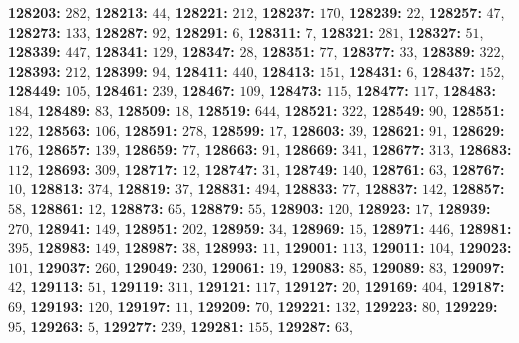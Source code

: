 \textsf{\bfseries 128203:} $282$, \textsf{\bfseries 128213:} $44$, \textsf{\bfseries 128221:} $212$, \textsf{\bfseries 128237:} $170$, \textsf{\bfseries 128239:} $22$, \textsf{\bfseries 128257:} $47$, \textsf{\bfseries 128273:} $133$, \textsf{\bfseries 128287:} $92$, \textsf{\bfseries 128291:} $6$, \textsf{\bfseries 128311:} $7$, \textsf{\bfseries 128321:} $281$, \textsf{\bfseries 128327:} $51$, \textsf{\bfseries 128339:} $447$, \textsf{\bfseries 128341:} $129$, \textsf{\bfseries 128347:} $28$, \textsf{\bfseries 128351:} $77$, \textsf{\bfseries 128377:} $33$, \textsf{\bfseries 128389:} $322$, \textsf{\bfseries 128393:} $212$, \textsf{\bfseries 128399:} $94$, \textsf{\bfseries 128411:} $440$, \textsf{\bfseries 128413:} $151$, \textsf{\bfseries 128431:} $6$, \textsf{\bfseries 128437:} $152$, \textsf{\bfseries 128449:} $105$, \textsf{\bfseries 128461:} $239$, \textsf{\bfseries 128467:} $109$, \textsf{\bfseries 128473:} $115$, \textsf{\bfseries 128477:} $117$, \textsf{\bfseries 128483:} $184$, \textsf{\bfseries 128489:} $83$, \textsf{\bfseries 128509:} $18$, \textsf{\bfseries 128519:} $644$, \textsf{\bfseries 128521:} $322$, \textsf{\bfseries 128549:} $90$, \textsf{\bfseries 128551:} $122$, \textsf{\bfseries 128563:} $106$, \textsf{\bfseries 128591:} $278$, \textsf{\bfseries 128599:} $17$, \textsf{\bfseries 128603:} $39$, \textsf{\bfseries 128621:} $91$, \textsf{\bfseries 128629:} $176$, \textsf{\bfseries 128657:} $139$, \textsf{\bfseries 128659:} $77$, \textsf{\bfseries 128663:} $91$, \textsf{\bfseries 128669:} $341$, \textsf{\bfseries 128677:} $313$, \textsf{\bfseries 128683:} $112$, \textsf{\bfseries 128693:} $309$, \textsf{\bfseries 128717:} $12$, \textsf{\bfseries 128747:} $31$, \textsf{\bfseries 128749:} $140$, \textsf{\bfseries 128761:} $63$, \textsf{\bfseries 128767:} $10$, \textsf{\bfseries 128813:} $374$, \textsf{\bfseries 128819:} $37$, \textsf{\bfseries 128831:} $494$, \textsf{\bfseries 128833:} $77$, \textsf{\bfseries 128837:} $142$, \textsf{\bfseries 128857:} $58$, \textsf{\bfseries 128861:} $12$, \textsf{\bfseries 128873:} $65$, \textsf{\bfseries 128879:} $55$, \textsf{\bfseries 128903:} $120$, \textsf{\bfseries 128923:} $17$, \textsf{\bfseries 128939:} $270$, \textsf{\bfseries 128941:} $149$, \textsf{\bfseries 128951:} $202$, \textsf{\bfseries 128959:} $34$, \textsf{\bfseries 128969:} $15$, \textsf{\bfseries 128971:} $446$, \textsf{\bfseries 128981:} $395$, \textsf{\bfseries 128983:} $149$, \textsf{\bfseries 128987:} $38$, \textsf{\bfseries 128993:} $11$, \textsf{\bfseries 129001:} $113$, \textsf{\bfseries 129011:} $104$, \textsf{\bfseries 129023:} $101$, \textsf{\bfseries 129037:} $260$, \textsf{\bfseries 129049:} $230$, \textsf{\bfseries 129061:} $19$, \textsf{\bfseries 129083:} $85$, \textsf{\bfseries 129089:} $83$, \textsf{\bfseries 129097:} $42$, \textsf{\bfseries 129113:} $51$, \textsf{\bfseries 129119:} $311$, \textsf{\bfseries 129121:} $117$, \textsf{\bfseries 129127:} $20$, \textsf{\bfseries 129169:} $404$, \textsf{\bfseries 129187:} $69$, \textsf{\bfseries 129193:} $120$, \textsf{\bfseries 129197:} $11$, \textsf{\bfseries 129209:} $70$, \textsf{\bfseries 129221:} $132$, \textsf{\bfseries 129223:} $80$, \textsf{\bfseries 129229:} $95$, \textsf{\bfseries 129263:} $5$, \textsf{\bfseries 129277:} $239$, \textsf{\bfseries 129281:} $155$, \textsf{\bfseries 129287:} $63$, 
